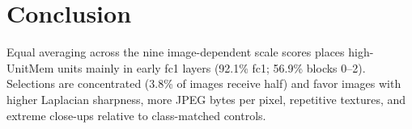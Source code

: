 \documentclass{article}
\begin{document}
\vspace{-14pt}
\section{Conclusion}
\label{sec:conclusion}
\vspace{-4pt}

Equal averaging across the nine image-dependent scale scores places high-UnitMem
units mainly in early fc1 layers (92.1\% fc1; 56.9\% blocks 0--2). Selections are
concentrated (3.8\% of images receive half) and favor images with higher
Laplacian sharpness, more JPEG bytes per pixel, repetitive textures, and extreme
close-ups relative to class-matched controls.

\clearpage


\end{document}
